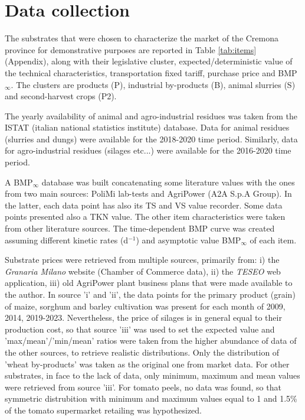 \section{Data collection}

The substrates that were chosen to characterize the market of the Cremona province for demonstrative purposes are reported in Table \ref{tab:items} (Appendix), along with their legislative cluster, expected/deterministic value of the technical characteristics, transportation fixed tariff, purchase price and BMP$_{\infty}$.
The clusters are products (P), industrial by-products (B), animal slurries (S) and second-harvest crops (P2).

The yearly availability of animal and agro-industrial residues was taken from the ISTAT (italian national statistics institute) database. Data for animal residues (slurries and dungs) were available for the 2018-2020 time period. Similarly, data for agro-industrial residues (silages etc...) were available for the 2016-2020 time period. 

A BMP$_{\infty}$ database was built concatenating some literature values with the ones from two main sources: PoliMi lab-tests and AgriPower (A2A S.p.A Group). In the latter, each data point has also its TS and VS value recorder. Some data points presented also a TKN value. The other item characteristics were taken from other literature sources. The time-dependent BMP curve was created assuming different kinetic rates (d$^{-1}$) and asymptotic value BMP$_{\infty}$ of each item.

Substrate prices were retrieved from multiple sources, primarily from: i) the \emph{Granaria Milano} website (Chamber of Commerce data), ii) the \emph{TESEO} web application, iii) old AgriPower plant business plans that were made available to the author. In source 'i' and 'ii', the data points for the primary product (grain) of maize, sorghum and barley cultivation was present for each month of 2009, 2014, 2019-2023. Nevertheless, the price of silages is in general equal to their production cost, so that source 'iii' was used to set the expected value and 'max/mean'/'min/mean' ratios were taken from the higher abundance of data of the other sources, to retrieve realistic distributions.
Only the distribution of 'wheat by-products' was taken as the original one from market data.
For other substrates, in face to the lack of data, only minimum, maximum and mean values were retrieved from source 'iii'.
For tomato peels, no data was found, so that symmetric distrubition with minimum and maximum values equal to 1 and 1.5\% of the tomato supermarket retailing was hypothesized. 

